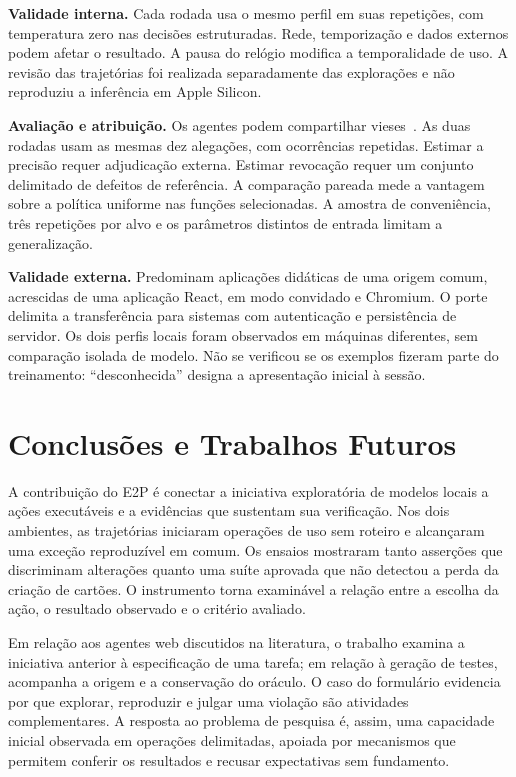 \documentclass[12pt]{article}
\begin{document}
\textbf{Validade interna.} Cada rodada usa o mesmo perfil em suas repetições, com temperatura zero nas decisões estruturadas. Rede, temporização e dados externos podem afetar o resultado. A pausa do relógio modifica a temporalidade de uso. A revisão das trajetórias foi realizada separadamente das explorações e não reproduziu a inferência em Apple Silicon.

\textbf{Avaliação e atribuição.} Os agentes podem compartilhar vieses~\cite{zheng2023judging}. As duas rodadas usam as mesmas dez alegações, com ocorrências repetidas. Estimar a precisão requer adjudicação externa. Estimar revocação requer um conjunto delimitado de defeitos de referência. A comparação pareada mede a vantagem sobre a política uniforme nas funções selecionadas. A amostra de conveniência, três repetições por alvo e os parâmetros distintos de entrada limitam a generalização.

\textbf{Validade externa.} Predominam aplicações didáticas de uma origem comum, acrescidas de uma aplicação React, em modo convidado e Chromium. O porte delimita a transferência para sistemas com autenticação e persistência de servidor. Os dois perfis locais foram observados em máquinas diferentes, sem comparação isolada de modelo. Não se verificou se os exemplos fizeram parte do treinamento: ``desconhecida'' designa a apresentação inicial à sessão.

\section{Conclusões e Trabalhos Futuros}\label{sec:conclusion}
A contribuição do E2P é conectar a iniciativa exploratória de modelos locais a ações executáveis e a evidências que sustentam sua verificação. Nos dois ambientes, as trajetórias iniciaram operações de uso sem roteiro e alcançaram uma exceção reproduzível em comum. Os ensaios mostraram tanto asserções que discriminam alterações quanto uma suíte aprovada que não detectou a perda da criação de cartões. O instrumento torna examinável a relação entre a escolha da ação, o resultado observado e o critério avaliado.

Em relação aos agentes web discutidos na literatura, o trabalho examina a iniciativa anterior à especificação de uma tarefa; em relação à geração de testes, acompanha a origem e a conservação do oráculo. O caso do formulário evidencia por que explorar, reproduzir e julgar uma violação são atividades complementares. A resposta ao problema de pesquisa é, assim, uma capacidade inicial observada em operações delimitadas, apoiada por mecanismos que permitem conferir os resultados e recusar expectativas sem fundamento.
\end{document}
